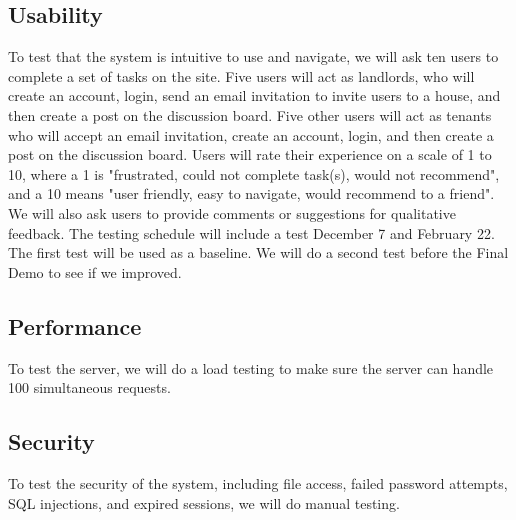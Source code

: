 \documentclass[12pt]{article}
\begin{document}
\subsection{Usability}
To test that the system is intuitive to use and navigate, we will ask ten users to complete a set of tasks on the site. Five users will act as landlords, who will create an account, login, send an email invitation to invite users to a house, and then create a post on the discussion board. Five other users will act as tenants who will accept an email invitation, create an account, login, and then create a post on the discussion board. Users will rate their experience on a scale of 1 to 10, where a 1 is "frustrated, could not complete task(s), would not recommend", and a 10 means "user friendly, easy to navigate, would recommend to a friend".  We will also ask users to provide comments or suggestions for qualitative feedback. The testing schedule will include a test December 7 and February 22. The first test will be used as a baseline. We will do a second test before the Final Demo to see if we improved.

\subsection{Performance}
To test the server, we will do a load testing to make sure the server can handle 100 simultaneous requests.

\subsection{Security}
To test the security of the system, including file access, failed password attempts, SQL injections, and expired sessions, we will do manual testing.
\end{document}
